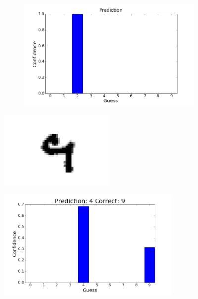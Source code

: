 \begin{frame}[plain]
\begin{figure}
\begin{subfigure}{0.1\textwidth}
\end{subfigure}
\\\vspace{-0.2cm}
\begin{subfigure}{0.55\textwidth}
\includegraphics[width=\textwidth]{cnn_prediction}
\end{subfigure}
\end{figure}
\end{frame}


\begin{frame}[plain]
\begin{figure}
\includegraphics[width = 0.5\textwidth]{wrong_guess_pic}
\end{figure}

\begin{figure}
\includegraphics[width = 0.8\textwidth]{wrong_guess2}
\end{figure}
\end{frame}

